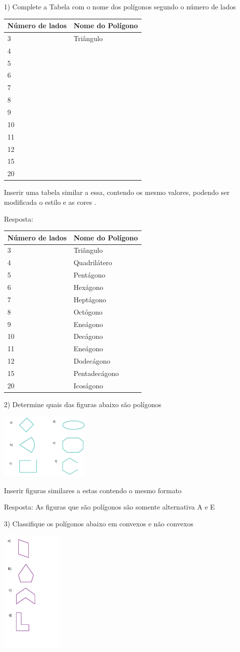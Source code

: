 1) Complete a Tabela com o nome dos polígonos segundo o número de lados

\begin{longtable}[]{@{}ll@{}}
\toprule
Número de lados & Nome do Polígono\tabularnewline
\midrule
\endhead
3 & Triângulo\tabularnewline
4 & ~\tabularnewline
5 & ~\tabularnewline
6 & ~\tabularnewline
7 & ~\tabularnewline
8 & ~\tabularnewline
9 & ~\tabularnewline
10 & ~\tabularnewline
11 & ~\tabularnewline
12 & ~\tabularnewline
15 & ~\tabularnewline
20 & ~\tabularnewline
\bottomrule
\end{longtable}

Inserir uma tabela similar a essa, contendo os mesmo valores, podendo
ser modificada o estilo e as cores .

Resposta:

\begin{longtable}[]{@{}ll@{}}
\toprule
Número de lados & Nome do Polígono\tabularnewline
\midrule
\endhead
3 & Triângulo\tabularnewline
4 & Quadrilátero\tabularnewline
5 & Pentágono\tabularnewline
6 & Hexágono\tabularnewline
7 & Heptágono\tabularnewline
8 & Octógono\tabularnewline
9 & Eneágono\tabularnewline
10 & Decágono\tabularnewline
11 & Eneágono\tabularnewline
12 & Dodecágono\tabularnewline
15 & Pentadecágono\tabularnewline
20 & Icoságono\tabularnewline
\bottomrule
\end{longtable}

2) Determine quais das figuras abaixo são polígonos

\includegraphics[width=1.7in,height=1.26763in]{./imgSAEB_8_MAT/media/image7.png}

Inserir figuras similares a estas contendo o mesmo formato

Resposta: As figuras que são polígonos são somente alternativa A e E

3) Classifique os polígonos abaixo em convexos e não convexos

\includegraphics[width=1.16236in,height=2.36667in]{./imgSAEB_8_MAT/media/image8.png}

